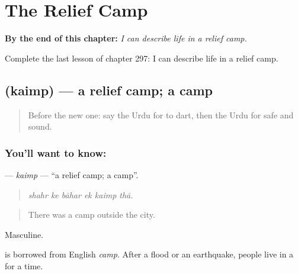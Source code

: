 
\chapter{The Relief Camp}
\label{ch:ur-the-relief-camp}

\begin{chapteropening}
\textbf{By the end of this chapter:} \emph{I can describe life in a relief camp.}

Complete the last lesson of chapter 297: I can describe life in a relief camp.
\end{chapteropening}

\section[\texorpdfstring{\ur{کیمپ} (kaimp)}{کیمپ (kaimp)}]{ (kaimp) — a relief camp; a camp}

\label{lesson:UR-C297-kaimp}



\begin{quote}
Before the new one: say the Urdu for to dart, then the Urdu for safe and sound.
\end{quote}

\subsection*{You'll want to know: }
\textbf{} — \emph{kaimp} — \textquotedblleft{}a relief camp; a camp\textquotedblright{}.

\begin{quote}
     
\end{quote}

\begin{quote}
\emph{shahr ke bāhar ek kaimp thā.}
\end{quote}

\begin{quote}
There was a camp outside the city.
\end{quote}

Masculine.

\begin{cousinweb}
is borrowed from English \emph{camp}. After a flood or an earthquake, people live in a \textbf{} for a time.
\end{cousinweb}

